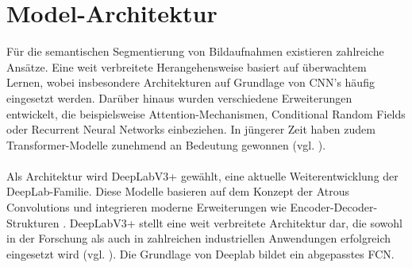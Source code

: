 \documentclass[12pt,DIV=15,BCOR=15mm,twoside,headsepline,abstract=true,listof=totoc,bibliography=totoc]{scrreprt}
\theoremstyle{remark}    %
\begin{document}
    \section{Model-Architektur}
    Für die semantischen Segmentierung von Bildaufnahmen existieren zahlreiche Ansätze. Eine weit verbreitete Herangehensweise basiert auf 
    überwachtem Lernen, wobei insbesondere Architekturen auf Grundlage von \ac{CNN}'s häufig eingesetzt werden. Darüber hinaus wurden verschiedene Erweiterungen 
    entwickelt, die beispielsweise Attention-Mechanismen, Conditional Random Fields oder Recurrent Neural Networks einbeziehen. In jüngerer 
    Zeit haben zudem Transformer-Modelle zunehmend an Bedeutung gewonnen (vgl. \cite{csurka2023semanticimagesegmentationdecades,
    zhou2024imagesegmentationfoundationmodel, minaee2020imagesegmentationusingdeep}).\\\\
    Als Architektur wird DeepLabV3+  \cite{chen2018encoderdecoderatrousseparableconvolution} gewählt, eine aktuelle Weiterentwicklung der DeepLab-Familie. Diese Modelle basieren auf dem Konzept der 
    Atrous Convolutions und integrieren moderne Erweiterungen wie Encoder-Decoder-Strukturen
    \cite{chen2018encoderdecoderatrousseparableconvolution,chen2017rethinkingatrousconvolutionsemantic}. 
    DeepLabV3+ stellt eine weit verbreitete Architektur dar, die sowohl in der Forschung als auch in 
    zahlreichen industriellen Anwendungen erfolgreich eingesetzt wird (vgl. \cite{csurka2023semanticimagesegmentationdecades, 
    minaee2020imagesegmentationusingdeep}). Die Grundlage von Deeplab bildet ein abgepasstes \ac{FCN}. \\\\
\end{document}

